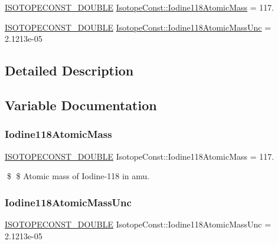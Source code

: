 \begin{DoxyCompactItemize}
\item 
\mbox{\hyperlink{group___isotope_const-_macros_ga8f45a7272ce02c0b4c65c44636ed719a}{I\+S\+O\+T\+O\+P\+E\+C\+O\+N\+S\+T\+\_\+\+D\+O\+U\+B\+LE}} \mbox{\hyperlink{group___isotope_const-_iodine-_i118_ga5af81d70633162fe9465803bd5dada6a}{Isotope\+Const\+::\+Iodine118\+Atomic\+Mass}} = 117.
\item 
\mbox{\hyperlink{group___isotope_const-_macros_ga8f45a7272ce02c0b4c65c44636ed719a}{I\+S\+O\+T\+O\+P\+E\+C\+O\+N\+S\+T\+\_\+\+D\+O\+U\+B\+LE}} \mbox{\hyperlink{group___isotope_const-_iodine-_i118_gac5a9eef093869f7fae5932bf8ed43ac2}{Isotope\+Const\+::\+Iodine118\+Atomic\+Mass\+Unc}} = 2.\+1213e-\/05
\end{DoxyCompactItemize}


\subsection{Detailed Description}


\subsection{Variable Documentation}
\mbox{\label{group___isotope_const-_iodine-_i118_ga5af81d70633162fe9465803bd5dada6a}} 
\subsubsection{\texorpdfstring{Iodine118\+Atomic\+Mass}{Iodine118AtomicMass}}
{\footnotesize\ttfamily \mbox{\hyperlink{group___isotope_const-_macros_ga8f45a7272ce02c0b4c65c44636ed719a}{I\+S\+O\+T\+O\+P\+E\+C\+O\+N\+S\+T\+\_\+\+D\+O\+U\+B\+LE}} Isotope\+Const\+::\+Iodine118\+Atomic\+Mass = 117.}

\$ \$ Atomic mass of Iodine-\/118 in amu. \mbox{\label{group___isotope_const-_iodine-_i118_gac5a9eef093869f7fae5932bf8ed43ac2}} 
\subsubsection{\texorpdfstring{Iodine118\+Atomic\+Mass\+Unc}{Iodine118AtomicMassUnc}}
{\footnotesize\ttfamily \mbox{\hyperlink{group___isotope_const-_macros_ga8f45a7272ce02c0b4c65c44636ed719a}{I\+S\+O\+T\+O\+P\+E\+C\+O\+N\+S\+T\+\_\+\+D\+O\+U\+B\+LE}} Isotope\+Const\+::\+Iodine118\+Atomic\+Mass\+Unc = 2.\+1213e-\/05}

